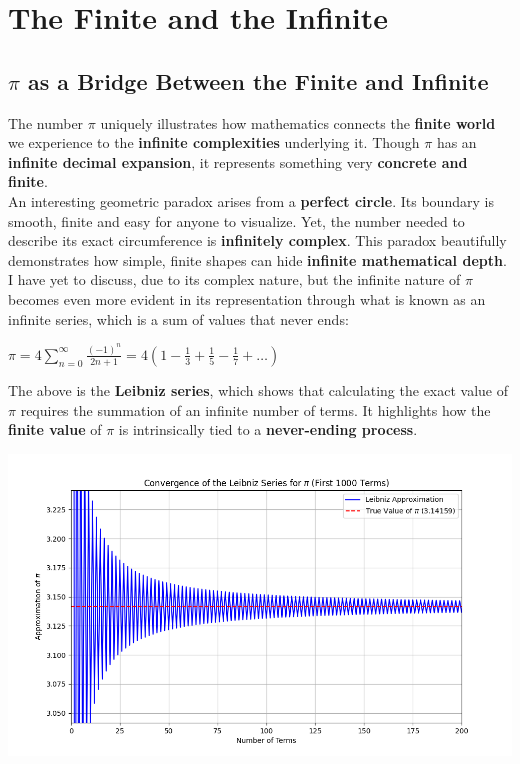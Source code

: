 \documentclass[12pt]{article}
\begin{document}
\section{The Finite and the Infinite}

\subsection{$\pi$ as a Bridge Between the Finite and Infinite}

\noindent The number $\pi$ uniquely illustrates how mathematics connects the \textbf{finite world} we experience to the \textbf{infinite complexities} underlying it. Though $\pi$ has an \textbf{infinite decimal expansion}, it represents something very \textbf{concrete and finite}. \\

\noindent An interesting geometric paradox arises from a \textbf{perfect circle}. Its boundary is smooth, finite and easy for anyone to visualize. Yet, the number needed to describe its exact circumference is \textbf{infinitely complex}. This paradox beautifully demonstrates how simple, finite shapes can hide \textbf{infinite mathematical depth}. \\

\noindent I have yet to discuss, due to its complex nature, but the infinite nature of $\pi$ becomes even more evident in its representation through what is known as an infinite series, which is a sum of values that never ends:
\begin{center}
    $\pi = 4 \sum\limits_{n=0}^\infty \frac{(-1)^n}{2n + 1} = 4\left(1 - \frac{1}{3} + \frac{1}{5} - \frac{1}{7} + \ldots\right)$ \quad [7]
\end{center}
The above is the \textbf{Leibniz series}, which shows that calculating the exact value of $\pi$ requires the summation of an infinite number of terms. It highlights how the \textbf{finite value} of $\pi$ is intrinsically tied to a \textbf{never-ending process}.

\includegraphics[width=1\textwidth]{images/Figure_3.png}
\end{document}
